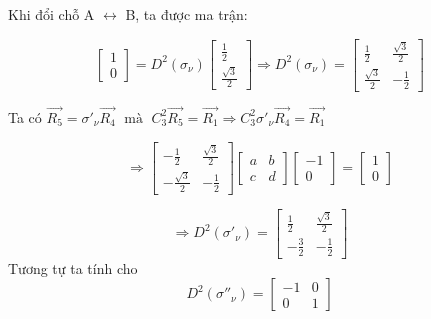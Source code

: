 \documentclass{article}
\begin{document}
Khi đổi chỗ A $\leftrightarrow$ B, ta được ma trận:

\[
    \renewcommand{\arraystretch}{0.75}
    \begin{bmatrix}
        1 \\
        0
    \end{bmatrix}
    = D^2(\sigma_\nu)
    \begin{bmatrix}
        \frac{1}{2} \\
        \frac{\sqrt{3}}{2}
    \end{bmatrix}
    \Rightarrow  D^2(\sigma_\nu) =
    \begin{bmatrix}
        \frac{1}{2}        & \frac{\sqrt{3}}{2} \\
        \frac{\sqrt{3}}{2} & -\frac{1}{2}
    \end{bmatrix}
\]

Ta có $ \vec{R_5} = \sigma'_\nu \vec{R_4} \; \text{ mà }\; C_3^2 \vec{R_5} = \vec{R_1} \Rightarrow  C_3^2 \sigma'_\nu \vec{R_4} = \vec{R_1}$


\[
    \renewcommand{\arraystretch}{0.75}
    \Rightarrow
    \begin{bmatrix}
        -\frac{1}{2}        & \frac{\sqrt{3}}{2} \\
        -\frac{\sqrt{3}}{2} & -\frac{1}{2}
    \end{bmatrix}
    \begin{bmatrix}
        a & b \\
        c & d
    \end{bmatrix}
    \begin{bmatrix}
        -1 \\
        0
    \end{bmatrix}
    =
    \begin{bmatrix}
        1 \\
        0
    \end{bmatrix}
\]


\[
    \renewcommand{\arraystretch}{0.75}
    \Rightarrow D^2\left(\sigma'_\nu\right) =
    \begin{bmatrix}
        \frac{1}{2}  & \frac{\sqrt{3}}{2} \\
        -\frac{3}{2} & -\frac{1}{2}
    \end{bmatrix}
\]
Tương tự ta tính cho
\[
    \renewcommand{\arraystretch}{0.75}
    D^2\left(\sigma''_\nu\right) =
    \begin{bmatrix}
        -1 & 0 \\
        0  & 1
    \end{bmatrix}
\]
\end{document}
